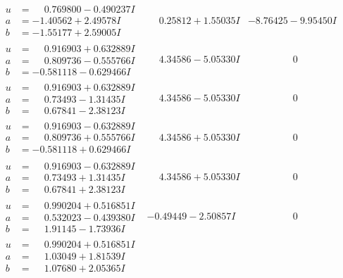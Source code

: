 \documentclass[1p]{elsarticle_modified}
\theoremstyle{definition}
\begin{document}
$$\begin{array}{c|c|c}
\begin{aligned}
u &= \phantom{-}0.769800 - 0.490237 I \\
a &= -1.40562 + 2.49578 I \\
b &= -1.55177 + 2.59005 I\end{aligned}
 & \phantom{-}0.25812 + 1.55035 I & -8.76425 - 9.95450 I \\ \hline\begin{aligned}
u &= \phantom{-}0.916903 + 0.632889 I \\
a &= \phantom{-}0.809736 - 0.555766 I \\
b &= -0.581118 - 0.629466 I\end{aligned}
 & \phantom{-}4.34586 - 5.05330 I & \phantom{-0.000000 } 0 \\ \hline\begin{aligned}
u &= \phantom{-}0.916903 + 0.632889 I \\
a &= \phantom{-}0.73493 - 1.31435 I \\
b &= \phantom{-}0.67841 - 2.38123 I\end{aligned}
 & \phantom{-}4.34586 - 5.05330 I & \phantom{-0.000000 } 0 \\ \hline\begin{aligned}
u &= \phantom{-}0.916903 - 0.632889 I \\
a &= \phantom{-}0.809736 + 0.555766 I \\
b &= -0.581118 + 0.629466 I\end{aligned}
 & \phantom{-}4.34586 + 5.05330 I & \phantom{-0.000000 } 0 \\ \hline\begin{aligned}
u &= \phantom{-}0.916903 - 0.632889 I \\
a &= \phantom{-}0.73493 + 1.31435 I \\
b &= \phantom{-}0.67841 + 2.38123 I\end{aligned}
 & \phantom{-}4.34586 + 5.05330 I & \phantom{-0.000000 } 0 \\ \hline\begin{aligned}
u &= \phantom{-}0.990204 + 0.516851 I \\
a &= \phantom{-}0.532023 - 0.439380 I \\
b &= \phantom{-}1.91145 - 1.73936 I\end{aligned}
 & -0.49449 - 2.50857 I & \phantom{-0.000000 } 0 \\ \hline\begin{aligned}
u &= \phantom{-}0.990204 + 0.516851 I \\
a &= \phantom{-}1.03049 + 1.81539 I \\
b &= \phantom{-}1.07680 + 2.05365 I\end{aligned}

\end{array}$$
\end{document}
